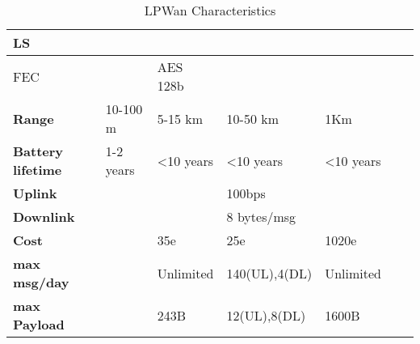 \begin{table}[!ht]
\begin{tabulary}{\columnwidth}{L|L|L|L|L|L|L}
	\ac{LS}                            &                & \ok                             & \ko           &             & \ko             & \ko             \\\hline
	\ac{FEC}                           &                & AES 128b                        & \ko           &             & \ok             & \ok             \\\hline
	\bf{Range}                         & 10-100 m       & 5-15 km                         & 10-50 km      & 1Km         &                 &                 \\\hline
	\bf{Battery lifetime}              & 1-2 years      & <10 years                       & <10 years     & <10 years   &                 &                 \\\hline
	\bf{Uplink}                        &                &                                 & 100bps        &             &                 &                 \\\hline
	\bf{Downlink}                      &                &                                 & 8 bytes/msg   &             &                 &                 \\\hline
	\bf{Cost}                          &                & 35e                             & 25e           & 1020e       &                 &                 \\\hline
	\bf{max msg/day}                   &                & Unlimited                       & 140(UL),4(DL) & Unlimited   &                 &                 \\\hline
	\bf{max Payload}                   &                & 243B                            & 12(UL),8(DL)  & 1600B       &                 &                 \\\hline

	\end{tabulary}
	\caption{\label{tab:LPWan_characteristics} LPWan Characteristics \cite{al-kashoash_comparison_2016}}
\end{table}

